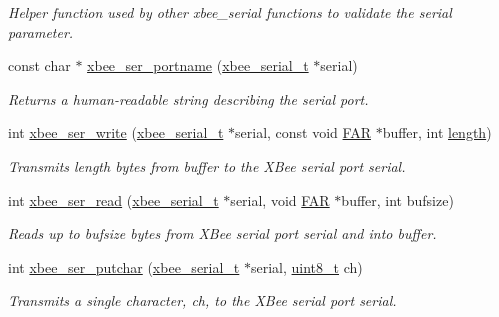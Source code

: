 \begin{DoxyCompactItemize}
\begin{DoxyCompactList}\small\item\em Helper function used by other xbee\+\_\+serial functions to validate the {\itshape serial} parameter. \end{DoxyCompactList}\item 
const char $\ast$ \hyperlink{group__hal__dos_ga898057d1b7645785e7f3d6256828d039}{xbee\+\_\+ser\+\_\+portname} (\hyperlink{structxbee__serial__t}{xbee\+\_\+serial\+\_\+t} $\ast$serial)
\begin{DoxyCompactList}\small\item\em Returns a human-\/readable string describing the serial port. \end{DoxyCompactList}\item 
int \hyperlink{group__hal__dos_ga2ca4e60c9d642084afa52dff9e1f6be4}{xbee\+\_\+ser\+\_\+write} (\hyperlink{structxbee__serial__t}{xbee\+\_\+serial\+\_\+t} $\ast$serial, const void \hyperlink{group__hal_gaef060b3456fdcc093a7210a762d5f2ed}{F\+AR} $\ast$buffer, int \hyperlink{group__zdo_gab2b3adeb2a67e656ff030b56727fd0ac}{length})
\begin{DoxyCompactList}\small\item\em Transmits {\itshape length} bytes from {\itshape buffer} to the X\+Bee serial port {\itshape serial}. \end{DoxyCompactList}\item 
int \hyperlink{group__hal__dos_ga8263312373c03a79a718142e051b3342}{xbee\+\_\+ser\+\_\+read} (\hyperlink{structxbee__serial__t}{xbee\+\_\+serial\+\_\+t} $\ast$serial, void \hyperlink{group__hal_gaef060b3456fdcc093a7210a762d5f2ed}{F\+AR} $\ast$buffer, int bufsize)
\begin{DoxyCompactList}\small\item\em Reads up to {\itshape bufsize} bytes from X\+Bee serial port {\itshape serial} and into {\itshape buffer}. \end{DoxyCompactList}\item 
int \hyperlink{group__hal__dos_ga86fea2345efb8bf9424228f0979b1849}{xbee\+\_\+ser\+\_\+putchar} (\hyperlink{structxbee__serial__t}{xbee\+\_\+serial\+\_\+t} $\ast$serial, \hyperlink{group__hal__dos_gae1affc9ca37cfb624959c866a73f83c2}{uint8\+\_\+t} ch)
\begin{DoxyCompactList}\small\item\em Transmits a single character, {\itshape ch}, to the X\+Bee serial port {\itshape serial}. \end{DoxyCompactList}\item 

\end{DoxyCompactItemize}
